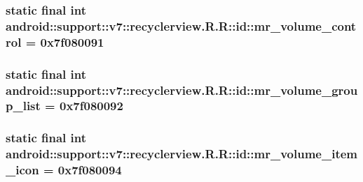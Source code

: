 \hypertarget{classandroid_1_1support_1_1v7_1_1recyclerview_1_1_r_1_1id_57438937d669613ad070395a2ae8e7c4}{
\subsubsection[{mr\_\-volume\_\-control}]{\setlength{\rightskip}{0pt plus 5cm}static final int android::support::v7::recyclerview.R.R::id::mr\_\-volume\_\-control = 0x7f080091}}
\label{classandroid_1_1support_1_1v7_1_1recyclerview_1_1_r_1_1id_57438937d669613ad070395a2ae8e7c4}


\hypertarget{classandroid_1_1support_1_1v7_1_1recyclerview_1_1_r_1_1id_afad5857adc427677e13df704496df98}{
\subsubsection[{mr\_\-volume\_\-group\_\-list}]{\setlength{\rightskip}{0pt plus 5cm}static final int android::support::v7::recyclerview.R.R::id::mr\_\-volume\_\-group\_\-list = 0x7f080092}}
\label{classandroid_1_1support_1_1v7_1_1recyclerview_1_1_r_1_1id_afad5857adc427677e13df704496df98}


\hypertarget{classandroid_1_1support_1_1v7_1_1recyclerview_1_1_r_1_1id_e38947756f11e5fe7a06c375e24eb914}{
\subsubsection[{mr\_\-volume\_\-item\_\-icon}]{\setlength{\rightskip}{0pt plus 5cm}static final int android::support::v7::recyclerview.R.R::id::mr\_\-volume\_\-item\_\-icon = 0x7f080094}}
\label{classandroid_1_1support_1_1v7_1_1recyclerview_1_1_r_1_1id_e38947756f11e5fe7a06c375e24eb914}


